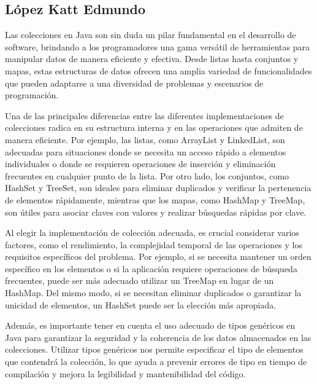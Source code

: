 \documentclass[a4paper,12pt]{article}
\begin{document}
\subsection{López Katt Edmundo}

Las colecciones en Java son sin duda un pilar fundamental en el desarrollo de software, brindando a los programadores una gama versátil de herramientas para manipular datos de manera eficiente y efectiva. Desde listas hasta conjuntos y mapas, estas estructuras de datos ofrecen una amplia variedad de funcionalidades que pueden adaptarse a una diversidad de problemas y escenarios de programación.

Una de las principales diferencias entre las diferentes implementaciones de colecciones radica en su estructura interna y en las operaciones que admiten de manera eficiente. Por ejemplo, las listas, como ArrayList y LinkedList, son adecuadas para situaciones donde se necesita un acceso rápido a elementos individuales o donde se requieren operaciones de inserción y eliminación frecuentes en cualquier punto de la lista. Por otro lado, los conjuntos, como HashSet y TreeSet, son ideales para eliminar duplicados y verificar la pertenencia de elementos rápidamente, mientras que los mapas, como HashMap y TreeMap, son útiles para asociar claves con valores y realizar búsquedas rápidas por clave.

Al elegir la implementación de colección adecuada, es crucial considerar varios factores, como el rendimiento, la complejidad temporal de las operaciones y los requisitos específicos del problema. Por ejemplo, si se necesita mantener un orden específico en los elementos o si la aplicación requiere operaciones de búsqueda frecuentes, puede ser más adecuado utilizar un TreeMap en lugar de un HashMap. Del mismo modo, si se necesitan eliminar duplicados o garantizar la unicidad de elementos, un HashSet puede ser la elección más apropiada.

Además, es importante tener en cuenta el uso adecuado de tipos genéricos en Java para garantizar la seguridad y la coherencia de los datos almacenados en las colecciones. Utilizar tipos genéricos nos permite especificar el tipo de elementos que contendrá la colección, lo que ayuda a prevenir errores de tipo en tiempo de compilación y mejora la legibilidad y mantenibilidad del código.



\end{document}
